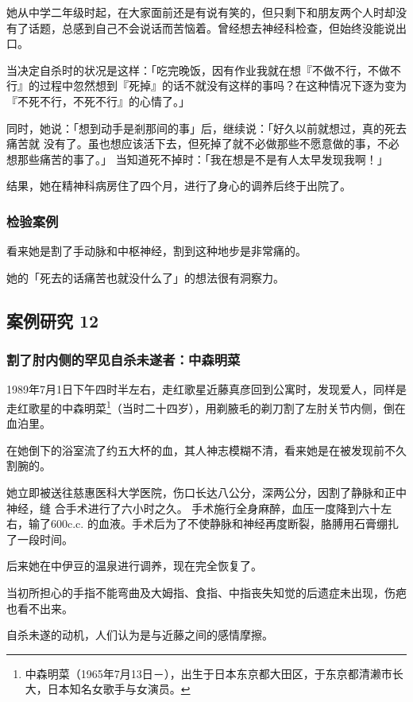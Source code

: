 \documentclass[UTF8]{ctexart}
\begin{document}
她从中学二年级时起，在大家面前还是有说有笑的，但只剩下和朋友两个人时却没有了话题，总感到自己不会说话而苦恼着。曾经想去神经科检查，但始终没能说出口。

当决定自杀时的状况是这样：「吃完晚饭，因有作业我就在想『不做不行，不做不行』的过程中忽然想到『死掉』的话不就没有这样的事吗？在这种情况下逐为变为『不死不行，不死不行』的心情了。」

同时，她说：「想到动手是剎那间的事」后，继续说：「好久以前就想过，真的死去痛苦就 没有了。虽也想应该活下去，但死掉了就不必做那些不愿意做的事，不必想那些痛苦的事了。」 当知道死不掉时：「我在想是不是有人太早发现我啊！」

结果，她在精神科病房住了四个月，进行了身心的调养后终于出院了。

\subsubsection*{检验案例}

看来她是割了手动脉和中枢神经，割到这种地步是非常痛的。

她的「死去的话痛苦也就没什么了」的想法很有洞察力。

\subsection{案例研究 12}
\subsubsection*{割了肘内侧的罕见自杀未遂者：中森明菜}

1989年7月1日下午四时半左右，走红歌星近藤真彦回到公寓时，发现爱人，同样是走红歌星的中森明菜\footnote{中森明菜（1965年7月13日－\qquad \qquad ），出生于日本东京都大田区，于东京都清濑市长大，日本知名女歌手与女演员。}（当时二十四岁），用剃腋毛的剃刀割了左肘关节内侧，倒在血泊里。

在她倒下的浴室流了约五大杯的血，其人神志模糊不清，看来她是在被发现前不久割腕的。

她立即被送往慈惠医科大学医院，伤口长达八公分，深两公分，因割了静脉和正中神经，缝 合手术进行了六小时之久。
手术施行全身麻醉，血压一度降到六十左右，输了$600$c.c. 的血液。手术后为了不使静脉和神经再度断裂，胳膊用石膏绷扎了一段时间。 

后来她在中伊豆的温泉进行调养，现在完全恢复了。

当初所担心的手指不能弯曲及大姆指、食指、中指丧失知觉的后遗症未出现，伤疤也看不出来。

自杀未遂的动机，人们认为是与近藤之间的感情摩擦。
\end{document}
